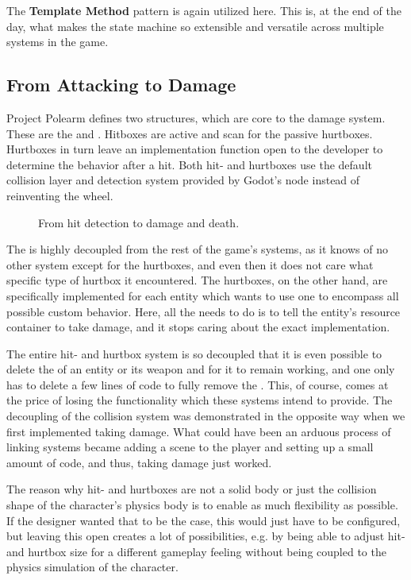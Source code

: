 \documentclass[../Main.tex]{subfiles}
\begin{document}
The \textbf{Template Method} pattern is again utilized here. This is, at the end of the day, what makes the state machine so extensible and versatile across multiple systems in the game.

\subsection{From Attacking to Damage}\label{sec:from-attacking-to-damage}

Project Polearm defines two structures, which are core to the damage system. These are the  and . Hitboxes are active and scan for the passive hurtboxes. Hurtboxes in turn leave an implementation function open to the developer to determine the behavior after a hit. Both hit- and hurtboxes use the default collision layer and detection system provided by Godot's  node instead of reinventing the wheel.

\begin{figure}[H]
    \centering
    
    \caption[From hit detection to damage and death. Own figure.]{From hit detection to damage and death.}
    \label{fig:hit-to-damage}
\end{figure}

The  is highly decoupled from the rest of the game's systems, as it knows of no other system except for the hurtboxes, and even then it does not care what specific type of hurtbox it encountered. The hurtboxes, on the other hand, are specifically implemented for each entity which wants to use one to encompass all possible custom behavior. Here, all the  needs to do is to tell the entity's resource container to take damage, and it stops caring about the exact implementation.

The entire hit- and hurtbox system is so decoupled that it is even possible to delete the  of an entity or its weapon and for it to remain working, and one only has to delete a few lines of code to fully remove the . This, of course, comes at the price of losing the functionality which these systems intend to provide. The decoupling of the collision system was demonstrated in the opposite way when we first implemented taking damage. What could have been an arduous process of linking systems became adding a scene to the player and setting up a small amount of code, and thus, taking damage just worked.

The reason why hit- and hurtboxes are not a solid body or just the collision shape of the character's physics body is to enable as much flexibility as possible. If the designer wanted that to be the case, this would just have to be configured, but leaving this open creates a lot of possibilities, e.g. by being able to adjust hit- and hurtbox size for a different gameplay feeling without being coupled to the physics simulation of the character.
\end{document}
